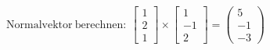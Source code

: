 \documentclass[preview]{standalone}
\begin{document}
\begin{center}
$\mathrm{Normalvektor \: berechnen: } \:\begin{bmatrix} 1 \\ 2 \\ 1 \end{bmatrix} \times \begin{bmatrix} 1 \\ -1 \\ 2 \end{bmatrix} = \begin{pmatrix} 5 \\ -1 \\ -3 \end{pmatrix}$
\end{center}
\end{document}
